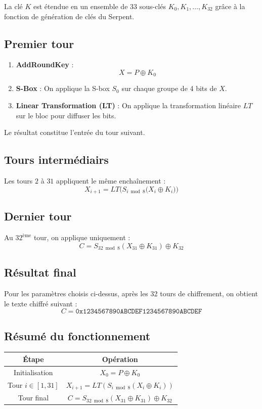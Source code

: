 \documentclass[12pt,a4paper]{report}
\begin{document}
La clé $K$ est étendue en un ensemble de 33 sous-clés $K_0, K_1, \dots, K_{32}$ 
grâce à la fonction de génération de clés du Serpent.

\subsection{Premier tour}

\begin{enumerate}
    \item \textbf{AddRoundKey} : 
    \[
        X = P \oplus K_0
    \]
    \item \textbf{S-Box} : On applique la S-box $S_0$ sur chaque groupe de 4 bits de $X$.
    \item \textbf{Linear Transformation (LT)} : On applique la transformation linéaire $LT$ sur le bloc pour diffuser les bits.
\end{enumerate}

Le résultat constitue l’entrée du tour suivant.

\subsection{Tours intermédiairs}

Les tours $2$ à $31$ appliquent le même enchaînement :
\[
    X_{i+1} = LT\Big(S_{i \bmod 8}\big(X_i \oplus K_i\big)\Big)
\]

\subsection{Dernier tour}

Au $32^{\text{ème}}$ tour, on applique uniquement :
\[
    C = S_{32 \bmod 8}(X_{31} \oplus K_{31}) \oplus K_{32}
\]

\subsection{Résultat final}

Pour les paramètres choisis ci-dessus, après les 32 tours de chiffrement, 
on obtient le texte chiffré suivant :
\[
    C = \texttt{0x1234567890ABCDEF1234567890ABCDEF}
\]

\subsection{Résumé du fonctionnement}

\begin{center}
\begin{tabular}{|c|c|}
\hline
\textbf{Étape} & \textbf{Opération} \\
\hline
Initialisation & $X_0 = P \oplus K_0$ \\
\hline
Tour $i \in [1,31]$ & $X_{i+1} = LT(S_{i \bmod 8}(X_i \oplus K_i))$ \\
\hline
Tour final & $C = S_{32 \bmod 8}(X_{31} \oplus K_{31}) \oplus K_{32}$ \\
\hline
\end{tabular}
\end{center}
\end{document}
